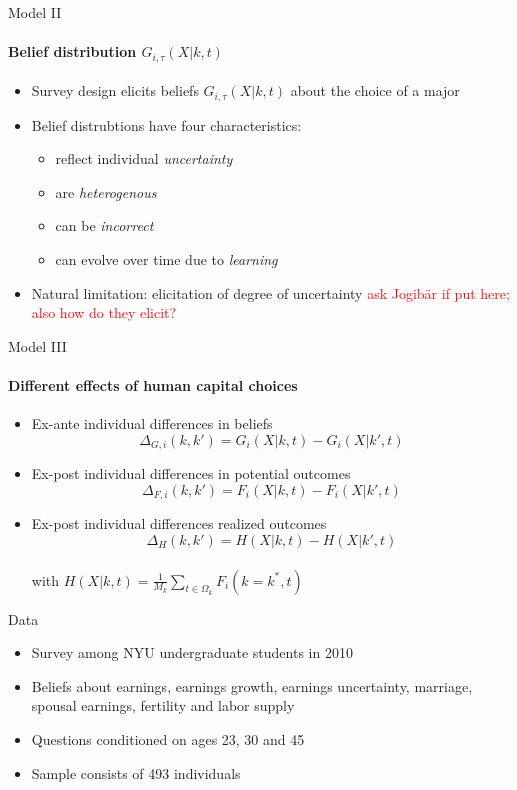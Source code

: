 \documentclass[12pt]{beamer}
\begin{document}
\begin{frame}{Model II}
    \framesubtitle{Belief distribution $G_{i,\tau}(X|k,t)$}
    \begin{itemize}
        \item Survey design elicits beliefs $G_{i,\tau}(X|k,t)$ about the choice of a major
        \item Belief distrubtions have four characteristics:
        \begin{itemize}
            \item reflect individual \textit{uncertainty}
            \item are \textit{heterogenous}
            \item can be \textit{incorrect}
            \item can evolve over time due to \textit{learning}
        \end{itemize}
        \item Natural limitation: elicitation of degree of uncertainty \textcolor{red}{ask Jogibär if put here; also how do they elicit?}
    \end{itemize}
\end{frame}

\begin{frame}{Model III}
    \framesubtitle{Different effects of human capital choices}
    \begin{itemize}
        \item Ex-ante individual differences in beliefs
        $$ \Delta_{G,i}(k,k') = G_i(X|k,t) - G_i(X|k',t) $$
        \item Ex-post individual differences in potential outcomes
        $$ \Delta_{F,i}(k,k') = F_i(X|k,t) - F_i(X|k',t) $$
        \item Ex-post individual differences realized outcomes
        $$ \Delta_{H}(k,k') = H(X|k,t) - H(X|k',t) $$ \\
        with $H(X|k,t) = \frac{1}{M_k} \sum_{t \in \Omega_k} F_i(k = k^*,t)$
    \end{itemize}
    
\end{frame}

\begin{frame}{Data}
    \begin{itemize}
        \item Survey among NYU undergraduate students in 2010
        \item Beliefs about earnings, earnings growth, earnings uncertainty, marriage, spousal earnings, fertility and labor supply
        \item Questions conditioned on ages 23, 30 and 45
        \item Sample consists of 493 individuals
    \end{itemize}
\end{frame}
\end{document}
